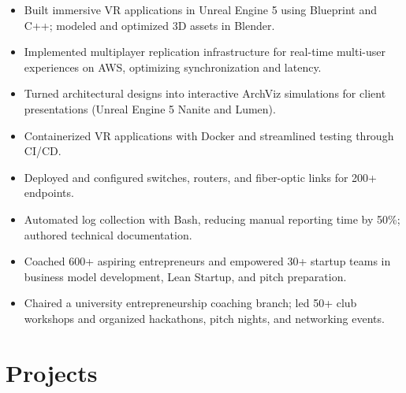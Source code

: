 \documentclass[a4paper,10pt]{article}
\begin{document}
\begin{itemize}
  \item Built immersive VR applications in Unreal Engine 5 using Blueprint and C++; modeled and optimized 3D assets in Blender.
  \item Implemented multiplayer replication infrastructure for real-time multi-user experiences on AWS, optimizing synchronization and latency.
  \item Turned architectural designs into interactive ArchViz simulations for client presentations (Unreal Engine 5 Nanite and Lumen).
  \item Containerized VR applications with Docker and streamlined testing through CI/CD.
\end{itemize}
\begin{itemize}
  \item Deployed and configured switches, routers, and fiber-optic links for 200+ endpoints.
  \item Automated log collection with Bash, reducing manual reporting time by 50\%; authored technical documentation.
\end{itemize}
\begin{itemize}
  \item Coached 600+ aspiring entrepreneurs and empowered 30+ startup teams in business model development, Lean Startup, and pitch preparation.
  \item Chaired a university entrepreneurship coaching branch; led 50+ club workshops and organized hackathons, pitch nights, and networking events.
\end{itemize}

\section*{Projects}
\pAIS
\pResumePipe
\pTerraformGCP
\pCapstone
\pCICD
\pTDDBDD
\pTekton
\pTDDSuites
\pKube
\pOpenShift
\pCodeEngine
\pRobotShop
\pAWSHA
\pWAF
\pAWSFound
\pAWSWeb
\pAWSNet
\pAWSRDS
\pAWSSec
\pAWSIaC
\pAWSServerless
\pAWSHybrid
\pEmotion
\pGitFlow
\pAgile
\pAirflow
\pHive
\pBackup
\pWeatherETL
\pGDP
\pFlaskAPI
\pXpose
\pDocker
\pDevContainer
\end{document}
